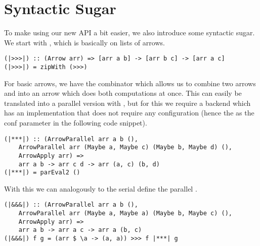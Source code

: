 \section{Syntactic Sugar}
To make using our new API a bit easier, we also introduce some syntactic sugar.
We start with \code{|>>>|}, which is basically \code{>>>} on lists of arrows.
\begin{lstlisting}[frame=htrbl]
(|>>>|) :: (Arrow arr) => [arr a b] -> [arr b c] -> [arr a c]
(|>>>|) = zipWith (>>>)
\end{lstlisting}
For basic arrows, we have the \code{***} combinator which allows us to combine two arrows  and  into an arrow  which does both computations at once. This can easily be translated into a parallel version with , but for this we require a backend which has an implementation that does not require any configuration (hence the \code{()} as the conf parameter in the following code snippet).
\begin{lstlisting}[frame=htrbl]
(|***|) :: (ArrowParallel arr a b (),
	ArrowParallel arr (Maybe a, Maybe c) (Maybe b, Maybe d) (),
	ArrowApply arr) =>
	arr a b -> arr c d -> arr (a, c) (b, d)
(|***|) = parEval2 ()
\end{lstlisting}
With this we can analogously to the serial \code{&&&} define the parallel \code{|&&&|}.
\begin{lstlisting}[frame=htrbl]
(|&&&|) :: (ArrowParallel arr a b (),
	ArrowParallel arr (Maybe a, Maybe a) (Maybe b, Maybe c) (),
	ArrowApply arr) =>
	arr a b -> arr a c -> arr a (b, c)
(|&&&|) f g = (arr $ \a -> (a, a)) >>> f |***| g
\end{lstlisting}